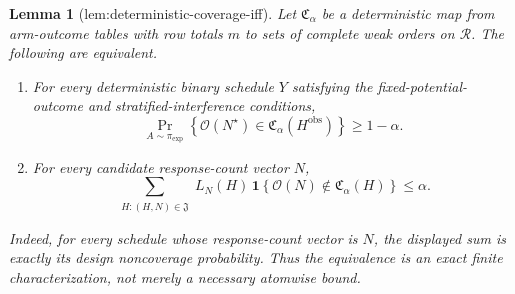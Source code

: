 \documentclass{article}
\newtheorem{lemma}{Lemma}
\begin{document}
\begin{lemma}[lem:deterministic-coverage-iff]\label{lem:deterministic-coverage-iff}
Let \(\mathfrak C_\alpha\) be a deterministic map from arm-outcome tables with row totals \(m\) to sets of complete weak orders on \(\mathcal R\). The following are equivalent.
\begin{enumerate}
\item For every deterministic binary schedule \(Y\) satisfying the fixed-potential-outcome and stratified-interference conditions,
\[
 \Pr_{A\sim\pi_{\exp}}\!\left\{\mathcal O(N^\star)\in
 \mathfrak C_\alpha(H^{\mathrm{obs}})\right\}\ge 1-\alpha.
\]
\item For every candidate response-count vector \(N\),
\[
 \sum_{\substack{H:(H,N)\in\mathfrak J}}
 L_N(H)\,
 \mathbf 1\!\left\{\mathcal O(N)\notin\mathfrak C_\alpha(H)\right\}
 \le \alpha.
\]
\end{enumerate}
Indeed, for every schedule whose response-count vector is \(N\), the displayed sum is exactly its design noncoverage probability. Thus the equivalence is an exact finite characterization, not merely a necessary atomwise bound.
\end{lemma}
\end{document}
